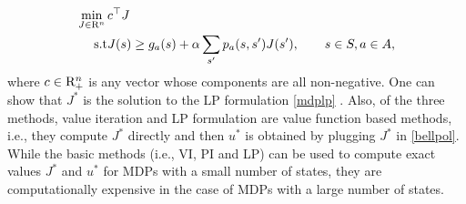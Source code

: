 \begin{align}\label{mdplp}
\begin{split}
\min_{J\in \R^n}\, &c^\top J\\
\text{s.t}\mb &J(s)\geq g_a(s)+\alpha\sum_{s'}p_a(s,s')J(s'), \qquad s\in S, a \in A,
\end{split}
\end{align}
where $c\in \mathrm{R}^n_+$ is any vector whose components are all non-negative. One can show that $J^*$ is the solution to the LP formulation \eqref{mdplp} \cite{BertB}. 
Also, of the three methods, value iteration and LP formulation are value function based methods, i.e., they compute $J^*$ directly and then $u^*$ is obtained by plugging $J^*$ in \eqref{bellpol}.\\
While the basic methods (i.e., VI, PI and LP) can be used to compute exact values $J^*$ and $u^*$ for MDPs with a small number of states, they are computationally expensive in the case of MDPs with a large number of states.\\
